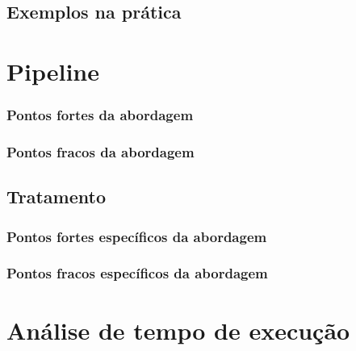 \documentclass[a4paper,12pt]{article}
\begin{document}
\subsection*{Exemplos na prática}

\section{Pipeline}

\subsubsection*{Pontos fortes da abordagem}

\subsubsection*{Pontos fracos da abordagem}

\subsection*{Tratamento}

\subsubsection*{Pontos fortes específicos da abordagem}

\subsubsection*{Pontos fracos específicos da abordagem}

\section{Análise de tempo de execução}
\end{document}
